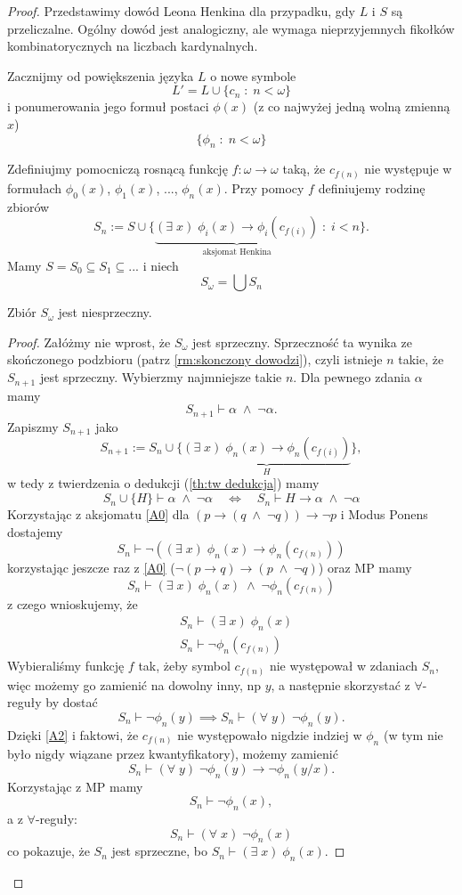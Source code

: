 \begin{proof}
  Przedstawimy dowód Leona Henkina dla przypadku, gdy $L$ i $S$ są przeliczalne. Ogólny dowód jest analogiczny, ale wymaga nieprzyjemnych fikołków kombinatorycznych na liczbach kardynalnych.

  Zacznijmy od powiększenia języka $L$ o nowe symbole
  $$L'=L\cup\{c_n\;:\;n<\omega\}$$
  i ponumerowania jego formuł postaci $\phi(x)$ (z co najwyżej jedną wolną zmienną $x$)
  $$\{\phi_n\;:\;n<\omega\}$$

  Zdefiniujmy pomocniczą rosnącą funkcję $f:\omega\to\omega$ taką, że $c_{f(n)}$ nie występuje w formułach $\phi_0(x)$, $\phi_1(x)$, ..., $\phi_n(x)$. Przy pomocy $f$ definiujemy rodzinę zbiorów
  $$S_n:=S\cup\{\underbrace{(\exists\;x)\;\phi_i(x)\to\phi_i(c_{f(i)})}_{\text{aksjomat Henkina}}\;:\;i<n\}.$$
  Mamy $S=S_0\subseteq S_1\subseteq ...$ i niech
  $$S_\omega=\bigcup S_n$$

  \begin{fact}{}{}
    Zbiór $S_\omega$ jest niesprzeczny.
  \end{fact}

  \begin{proof}
    Załóżmy nie wprost, że $S_\omega$ jest sprzeczny. Sprzeczność ta wynika ze skończonego podzbioru (patrz \ref{rm:skonczony dowodzi}), czyli istnieje $n$ takie, że $S_{n+1}$ jest sprzeczny. Wybierzmy najmniejsze takie $n$. Dla pewnego zdania $\alpha$ mamy
    $$S_{n+1}\vdash\alpha\;\land\;\neg\alpha.$$
    Zapiszmy $S_{n+1}$ jako
    $$S_{n+1}:=S_n\cup\{\underbrace{(\exists\;x)\;\phi_n(x)\to\phi_n(c_{f(i)})}_{H}\},$$
    w tedy z twierdzenia o dedukcji (\ref{th:tw dedukcja}) mamy
    $$S_n\cup\{H\}\vdash \alpha\;\land\;\neg\alpha\quad\iff\quad S_n\vdash H\to\alpha\;\land\;\neg\alpha$$
    Korzystając z aksjomatu \ref{A0} dla $(p\to(q\;\land\;\neg q))\to\neg p$ i Modus Ponens dostajemy
    $$S_n\vdash \neg((\exists\;x)\;\phi_n(x)\to\phi_n(c_{f(n)}))$$
    korzystając jeszcze raz z \ref{A0} ($\neg(p\to q)\to (p\;\land\;\neg q)$) oraz MP mamy
    $$S_n\vdash (\exists\;x)\;\phi_n(x)\;\land\;\neg\phi_n(c_{f(n)})$$
    z czego wnioskujemy, że
    \begin{align*}
      &S_n\vdash (\exists\;x)\;\phi_n(x)\\ 
      &S_n\vdash \neg\phi_n(c_{f(n)})
    \end{align*}
    Wybieraliśmy funkcję $f$ tak, żeby symbol $c_{f(n)}$ nie występował w zdaniach $S_n$, więc możemy go zamienić na dowolny inny, np $y$, a następnie skorzystać z $\forall$-reguły by dostać
    $$S_n\vdash \neg\phi_n(y)\implies S_n\vdash (\forall\;y)\;\neg\phi_n(y).$$
    Dzięki \ref{A2} i faktowi, że $c_{f(n)}$ nie występowało nigdzie indziej w $\phi_n$ (w tym nie było nigdy wiązane przez kwantyfikatory), możemy zamienić
    $$S_n\vdash (\forall\;y)\;\neg\phi_n(y)\to \neg\phi_n(y/x).$$
    Korzystając z MP mamy
    $$S_n\vdash \neg\phi_n(x),$$
    a z $\forall$-reguły:
    $$S_n\vdash (\forall\;x)\;\neg\phi_n(x)$$
    co pokazuje, że $S_n$ jest sprzeczne, bo $S_n\vdash (\exists\;x)\;\phi_n(x)$.
  \end{proof}







\end{proof}
